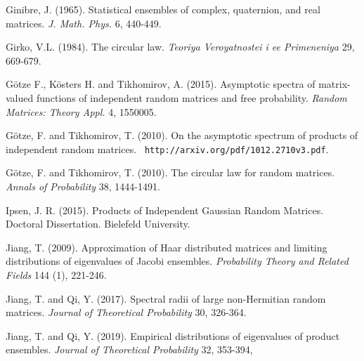 \documentclass[11pt]{article}
\numberwithin{equation}{section}
\begin{document}
\begin{thebibliography}{AA}



Ginibre, J. (1965). Statistical ensembles of complex, quaternion,
and real matrices. {\it J. Math. Phys.} 6, 440-449.

Girko, V.L. (1984). The circular law. {\it Teoriya Veroyatnostei i
ee Primeneniya} 29, 669-679.


G\"otze F., K\"osters H. and  Tikhomirov, A. (2015). Asymptotic
spectra of matrix-valued functions of independent random matrices
and free probability. {\it Random Matrices: Theory Appl.} 4,
1550005.

G\"{o}tze, F. and Tikhomirov, T. (2010). On the asymptotic spectrum
of products of independent random matrices. {\tt
http://arxiv.org/pdf/1012.2710v3.pdf}.


G\"{o}tze, F. and Tikhomirov, T. (2010). The circular law for random matrices. {\it Annals of Probability} 38, 1444-1491.





Ipsen, J. R.  (2015). Products of Independent Gaussian Random
Matrices. Doctoral Dissertation. Bielefeld University.


Jiang, T.  (2009). Approximation of Haar distributed matrices and
limiting distributions of eigenvalues of Jacobi ensembles.  {\it
Probability Theory and Related Fields} 144 (1), 221-246.


Jiang, T. and Qi, Y. (2017). Spectral radii of large non-Hermitian
random matrices. {\it Journal of Theoretical Probability} 30,
326-364.

Jiang, T.  and Qi, Y. (2019). Empirical distributions of eigenvalues
of product ensembles. {\it Journal of Theoretical Probability} 32,
353-394,





\end{thebibliography}
\end{document}
